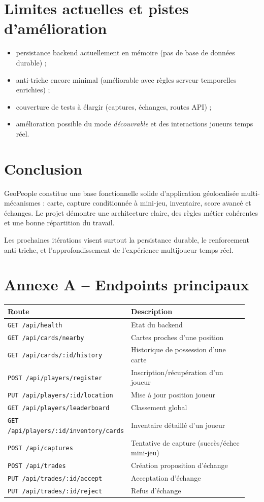 \documentclass[11pt,a4paper]{article}
\begin{document}
\section{Limites actuelles et pistes d'amélioration}
\begin{itemize}[leftmargin=1.2cm]
  \item persistance backend actuellement en mémoire (pas de base de données durable) ;
  \item anti-triche encore minimal (améliorable avec règles serveur temporelles enrichies) ;
  \item couverture de tests à élargir (captures, échanges, routes API) ;
  \item amélioration possible du mode \emph{découvrable} et des interactions joueurs temps réel.
\end{itemize}

\section{Conclusion}
GeoPeople constitue une base fonctionnelle solide d'application géolocalisée multi-mécanismes : carte, capture conditionnée à mini-jeu, inventaire, score avancé et échanges. Le projet démontre une architecture claire, des règles métier cohérentes et une bonne répartition du travail.

Les prochaines itérations visent surtout la persistance durable, le renforcement anti-triche, et l'approfondissement de l'expérience multijoueur temps réel.

\appendix
\section{Annexe A -- Endpoints principaux}
\begin{longtable}{p{0.26\linewidth} p{0.68\linewidth}}
\toprule
\textbf{Route} & \textbf{Description} \\
\midrule
\texttt{GET /api/health} & Etat du backend \\
\texttt{GET /api/cards/nearby} & Cartes proches d'une position \\
\texttt{GET /api/cards/:id/history} & Historique de possession d'une carte \\
\texttt{POST /api/players/register} & Inscription/récupération d'un joueur \\
\texttt{PUT /api/players/:id/location} & Mise à jour position joueur \\
\texttt{GET /api/players/leaderboard} & Classement global \\
\texttt{GET /api/players/:id/inventory/cards} & Inventaire détaillé d'un joueur \\
\texttt{POST /api/captures} & Tentative de capture (succès/échec mini-jeu) \\
\texttt{POST /api/trades} & Création proposition d'échange \\
\texttt{PUT /api/trades/:id/accept} & Acceptation d'échange \\
\texttt{PUT /api/trades/:id/reject} & Refus d'échange \\
\bottomrule
\end{longtable}
\end{document}

